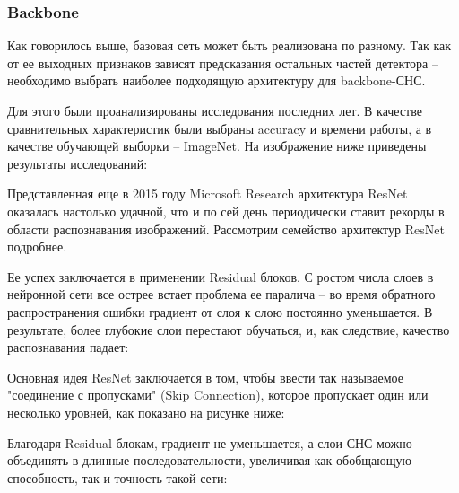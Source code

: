 \subsubsection{Backbone}

Как говорилось выше, базовая сеть может быть реализована по разному. Так как от ее выходных признаков зависят предсказания остальных частей детектора -- необходимо выбрать наиболее подходящую архитектуру для backbone-СНС.

Для этого были проанализированы исследования последних лет. В качестве сравнительных характеристик были выбраны accuracy и времени работы, а в качестве обучающей выборки -- ImageNet. На изображение ниже приведены результаты исследований:


Представленная еще в 2015 году Microsoft Research архитектура ResNet \cite{lib-resnet} оказалась настолько удачной, что и по сей день периодически ставит рекорды в области распознавания изображений. Рассмотрим семейство архитектур ResNet подробнее.

Ее успех заключается в применении Residual блоков. С ростом числа слоев в нейронной сети все острее встает проблема ее паралича -- во время обратного распространения ошибки градиент от слоя к слою постоянно уменьшается. В результате, более глубокие слои перестают обучаться, и, как следствие, качество распознавания падает:


Основная идея ResNet заключается в том, чтобы ввести так называемое "соединение с пропусками" (Skip Connection), которое пропускает один или несколько уровней, как показано на рисунке ниже:


Благодаря Residual блокам, градиент не уменьшается, а слои СНС можно объединять в длинные последовательности, увеличивая как обобщающую способность, так и точность такой сети:


